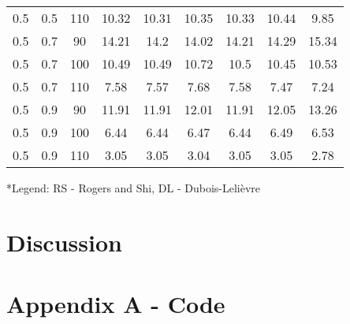 \documentclass{article}
\begin{document}
\begin{table}[H]
\begin{tabular}{|c|c|c|c|c|c|c|c|c|}
  0.5 & 0.5 & 110 & 10.32 & 10.31 & 10.35 & 10.33 & 10.44 & 9.85 \\
  0.5 & 0.7 & 90 & 14.21 & 14.2 & 14.02 & 14.21 & 14.29 & 15.34 \\
  0.5 & 0.7 & 100 & 10.49 & 10.49 & 10.72 & 10.5 & 10.45 & 10.53 \\
  0.5 & 0.7 & 110 & 7.58 & 7.57 & 7.68 & 7.58 & 7.47 & 7.24 \\
  0.5 & 0.9 & 90 & 11.91 & 11.91 & 12.01 & 11.91 & 12.05 & 13.26 \\
  0.5 & 0.9 & 100 & 6.44 & 6.44 & 6.47 & 6.44 & 6.49 & 6.53 \\
  0.5 & 0.9 & 110 & 3.05 & 3.05 & 3.04 & 3.05 & 3.05 & 2.78 \\
  \hline
  \end{tabular}
\end{table}
\scriptsize
*Legend: RS - Rogers and Shi, DL - Dubois-Leli\`{e}vre
\normalsize

\section{Discussion}

\section{Appendix A - Code}



\end{document}
